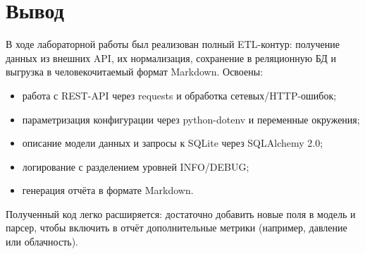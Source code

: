 \documentclass[oneside,a4paper,14pt]{extarticle}
\begin{document}
\section*{Вывод}
В ходе лабораторной работы был реализован полный ETL-контур: получение данных из внешних API, их нормализация, сохранение в реляционную БД и выгрузка в человекочитаемый формат Markdown. Освоены:
\begin{itemize}
	\item работа с REST-API через requests и обработка сетевых/HTTP-ошибок;
	\item параметризация конфигурации через python-dotenv и переменные окружения;
	\item описание модели данных и запросы к SQLite через SQLAlchemy 2.0;
	\item логирование с разделением уровней INFO/DEBUG;
	\item генерация отчёта в формате Markdown.
\end{itemize}
Полученный код легко расширяется: достаточно добавить новые поля в модель и парсер, чтобы включить в отчёт дополнительные метрики (например, давление или облачность).
\end{document}
